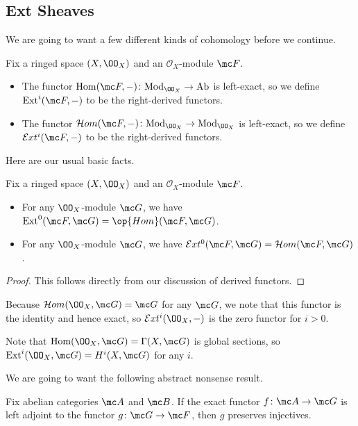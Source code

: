\documentclass[../notes.tex]{subfiles}
\begin{document}
\subsection{Ext Sheaves}
We are going to want a few different kinds of cohomology before we continue.
\begin{definition}[Ext]
	Fix a ringed space $(X,\OO_X)$ and an $\mathcal O_X$-module $\mc F$.
	\begin{itemize}
		\item The functor $\mathrm{Hom}(\mc F,-)\colon\mathrm{Mod}_{\OO_X}\to\mathrm{Ab}$ is left-exact, so we define $\mathrm{Ext}^i(\mc F,-)$ to be the right-derived functors.
		\item The functor $\mathcal Hom(\mc F,-)\colon\mathrm{Mod}_{\OO_X}\to\mathrm{Mod}_{\OO_X}$ is left-exact, so we define $\mathcal Ext^i(\mc F,-)$ to be the right-derived functors.
	\end{itemize}
\end{definition}
Here are our usual basic facts.
\begin{lemma}
	Fix a ringed space $(X,\OO_X)$ and an $\mathcal O_X$-module $\mc F$.
	\begin{itemize}
		\item For any $\OO_X$-module $\mc G$, we have $\mathrm{Ext}^0(\mc F,\mc G)=\op{Hom}(\mc F,\mc G)$.
		\item For any $\OO_X$-module $\mc G$, we have $\mathcal Ext^0(\mc F,\mc G)=\mathcal Hom(\mc F,\mc G)$.
	\end{itemize}
\end{lemma}
\begin{proof}
	This follows directly from our discussion of derived functors.
\end{proof}
\begin{example}
	Because $\mathcal Hom(\OO_X,\mc G)=\mc G$ for any $\mc G$, we note that this functor is the identity and hence exact, so $\mathcal Ext^i(\OO_X,-)$ is the zero functor for $i>0$.
\end{example}
\begin{example}
	Note that $\mathrm{Hom}(\OO_X,\mc G)=\Gamma(X,\mc G)$ is global sections, so $\mathrm{Ext}^i(\OO_X,\mc G)=H^i(X,\mc G)$ for any $i$.
\end{example}
We are going to want the following abstract nonsense result.
\begin{lemma}
	Fix abelian categories $\mc A$ and $\mc B$. If the exact functor $f\colon\mc A\to\mc G$ is left adjoint to the functor $g\colon\mc G\to\mc F$, then $g$ preserves injectives.
\end{lemma}
\end{document}
